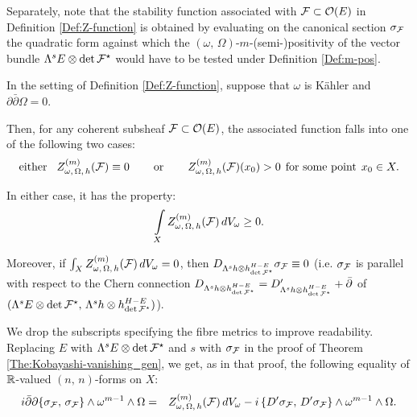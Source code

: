 \documentclass[12pt]{article}
\begin{document}
Separately, note that the stability function associated with ${\cal F}\subset{\cal O}(E)$ in Definition \ref{Def:Z-function} is obtained by evaluating on the canonical section $\sigma_{{\cal F}}$ the quadratic form against which the $(\omega,\,\Omega)$-$m$-(semi-)positivity of the vector bundle $\Lambda^s E\otimes\det{\cal F}^\star$ would have to be tested under Definition \ref{Def:m-pos}.

\begin{Prop}\label{Prop:Z-function_alternative} In the setting of Definition \ref{Def:Z-function}, suppose that $\omega$ is K\"ahler and $\partial\bar\partial\Omega = 0$.

  Then, for any coherent subsheaf ${\cal F}\subset{\cal O}(E)$, the associated function falls into one of the following two cases: \begin{eqnarray}\label{eqn:Z-function_alternative}\mbox{either}\hspace{2ex} Z_{\omega,\,\Omega,\,h}^{(m)}({\cal F})\equiv 0 \hspace{5ex}\mbox{or}\hspace{5ex} Z_{\omega,\,\Omega,\,h}^{(m)}({\cal F})(x_0)>0 \hspace{1ex}\mbox{for some point}\hspace{1ex} x_0\in X.\end{eqnarray}

  In either case, it has the property: \begin{eqnarray}\label{eqn:Z-function_integral}\int\limits_X Z_{\omega,\,\Omega,\,h}^{(m)}({\cal F})\,dV_\omega \geq 0.\end{eqnarray}

  Moreover, if $\int_XZ_{\omega,\,\Omega,\,h}^{(m)}({\cal F})\,dV_\omega = 0$, then $D_{\Lambda^sh\otimes h^{H-E}_{\det{\cal F}^\star}}\sigma_{{\cal F}}\equiv 0$ (i.e. $\sigma_{{\cal F}}$ is parallel with respect to the Chern connection $D_{\Lambda^sh\otimes h^{H-E}_{\det{\cal F}^\star}} = D_{\Lambda^sh\otimes h^{H-E}_{\det{\cal F}^\star}}' + \bar\partial$ of $(\Lambda^s E\otimes\det{\cal F}^\star,\,\Lambda^sh\otimes h^{H-E}_{\det{\cal F}^\star})$).


\end{Prop}

 We drop the subscripts specifying the fibre metrics to improve readability. Replacing $E$ with $\Lambda^s E\otimes\det{\cal F}^\star$ and $s$ with $\sigma_{{\cal F}}$ in the proof of Theorem \ref{The:Kobayashi-vanishing_gen}, we get, as in that proof, the following equality of $\mathbb{R}$-valued $(n,\,n)$-forms on $X$: \begin{eqnarray}\label{eqn:Z-function_alternative_proof_1}i\bar\partial\partial\{\sigma_{{\cal F}},\,\sigma_{{\cal F}}\}\wedge\omega^{m-1}\wedge\Omega & = & Z_{\omega,\,\Omega,\,h}^{(m)}({\cal F})\,dV_\omega - i\,\{D'\sigma_{{\cal F}},\,D'\sigma_{{\cal F}}\}\wedge\omega^{m-1}\wedge\Omega.\end{eqnarray}
\end{document}

